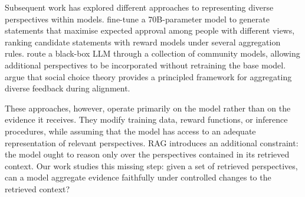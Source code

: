Subsequent work has explored different approaches to representing diverse perspectives within models. \citet{bakker2022finetuning} fine-tune a 70B-parameter model to generate statements that maximise expected approval among people with different views, ranking candidate statements with reward models under several aggregation rules. \citet{feng-etal-2024-modular} route a black-box LLM through a collection of community models, allowing additional perspectives to be incorporated without retraining the base model. \citet{pmlr-v235-conitzer24a} argue that social choice theory provides a principled framework for aggregating diverse feedback during alignment.

These approaches, however, operate primarily on the model rather than on the evidence it receives. They modify training data, reward functions, or inference procedures, while assuming that the model has access to an adequate representation of relevant perspectives. RAG introduces an additional constraint: the model ought to reason only over the perspectives contained in its retrieved context. Our work studies this missing step: given a set of retrieved perspectives, can a model aggregate evidence faithfully under controlled changes to the retrieved context?
